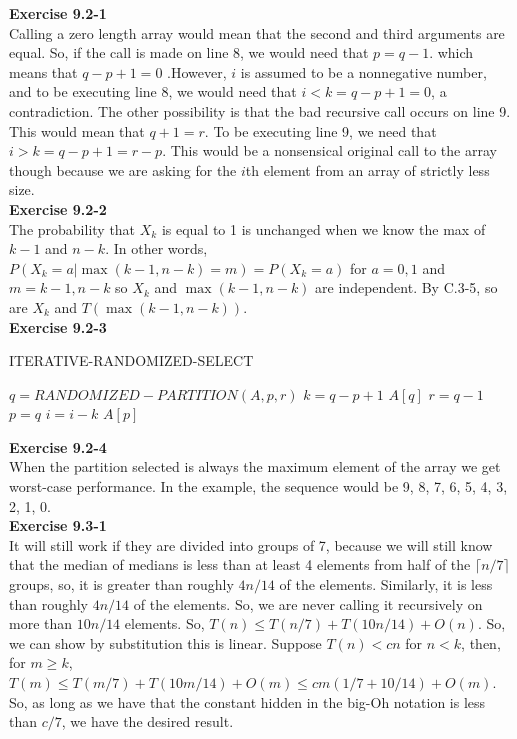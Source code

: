 \documentclass{article}
\begin{document}
\noindent\textbf{ Exercise 9.2-1} \\

Calling a zero length array would mean that the second and third arguments are equal. So, if the call is made on line 8, we would need that $p=q-1$. which means that $q-p+1=0$ .However, $i$ is assumed to be a nonnegative number, and to be executing line 8, we would need that $i < k = q-p+1=0$, a contradiction. The other possibility is that the bad recursive call occurs on line 9. This would mean that $q+1=r$. To be executing line 9, we need that $i>k = q-p+1 = r-p$. This would be a nonsensical original call to the array though because we are asking for the $i$th element from an array of strictly less size. \\

\noindent\textbf{Exercise 9.2-2}\\

The probability that $X_k$ is equal to 1 is unchanged when we know the max of $k-1$ and $n-k$.  In other words, $P(X_k = a | \max(k-1, n-k) = m) = P(X_k = a)$ for $a=0,1$ and $m=k-1, n-k$ so $X_k$ and $\max(k-1, n-k)$ are independent. By C.3-5, so are $X_k$ and $T(\max(k-1, n-k))$. \\

\noindent\textbf{ Exercise 9.2-3} \\

\begin{algorithm}
\caption{ ITERATIVE-RANDOMIZED-SELECT}
\begin{algorithmic}
\State $q = RANDOMIZED-PARTITION(A,p,r)$
\State $k=q-p+1$
\State \Return $A[q]$
\EndIf
{}
\State $r = q-1$
\Else
\State $p=q$
\State $i=i-k$
\EndIf
\EndWhile
\State \Return $A[p]$

\end{algorithmic}
\end{algorithm}

\noindent\textbf{Exercise 9.2-4}\\

When the partition selected is always the maximum element of the array we get worst-case performance.  In the example, the sequence would be 9, 8, 7, 6, 5, 4, 3, 2, 1, 0. \\

\noindent\textbf{ Exercise 9.3-1} \\

It will still work if they are divided into groups of 7, because we will still know that the median of medians is less than at least 4 elements from half of the $\lceil n/7 \rceil$ groups, so, it is greater than roughly $4n/14$ of the elements. Similarly, it is less than roughly $4n/14$ of the elements. So, we are never calling it recursively on more than $10n/14$ elements. So, $T(n) \le T(n/7) + T(10n/14)+O(n)$. So, we can show by substitution this is linear. Suppose $T(n) < cn$ for $n<k$, then, for $m\ge k$, $T(m) \le T(m/7) + T(10m/14) + O(m) \le cm(1/7+10/14) + O(m)$. So, as long as we have that the constant hidden in the big-Oh notation is less than $c/7$, we have the desired result.\\
\end{document}
